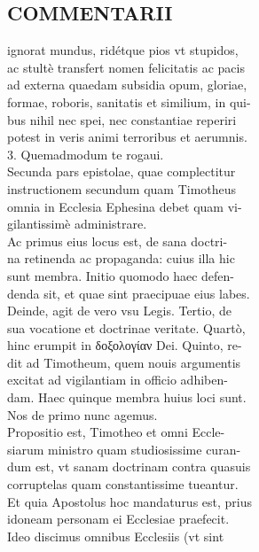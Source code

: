 \documentclass{article}
\begin{document}
\begin{pages}
\section*{COMMENTARII \\
                }ignorat mundus, ridétque pios vt stupidos, \\
                ac stultè transfert nomen felicitatis ac pacis \\
                ad externa quaedam subsidia opum, gloriae, \\
                formae, roboris, sanitatis et similium, in qui- \\
                bus nihil nec spei, nec constantiae reperiri \\
                potest in veris animi terroribus et aerumnis. \\
                3. Quemadmodum te rogaui. \\
                Secunda pars epistolae, quae complectitur \\
                instructionem secundum quam Timotheus \\
                omnia in Ecclesia Ephesina debet quam vi- \\
                gilantissimè administrare. \\
                Ac primus eius locus est, de sana doctri- \\
                na retinenda ac propaganda: cuius illa hic \\
                sunt membra. Initio quomodo haec defen- \\
                denda sit, et quae sint praecipuae eius labes. \\
                Deinde, agit de vero vsu Legis. Tertio, de \\
                sua vocatione et doctrinae veritate. Quartò, \\
                hinc erumpit in δοξολογίαν Dei. Quinto, re- \\
                dit ad Timotheum, quem nouis argumentis \\
                excitat ad vigilantiam in officio adhiben- \\
                dam. Haec quinque membra huius loci sunt. \\
                Nos de primo nunc agemus. \\
                Propositio est, Timotheo et omni Eccle- \\
                siarum ministro quam studiosissime curan- \\
                dum est, vt sanam doctrinam contra quasuis \\
                corruptelas quam constantissime tueantur. \\
                Et quia Apostolus hoc mandaturus est, prius \\
                idoneam personam ei Ecclesiae praefecit. \\
                Ideo discimus omnibus Ecclesiis (vt sint \\
                

\end{pages}
\end{document}

